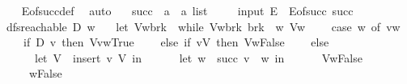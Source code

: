 \begin{isabellebody}
%
\isadelimproof
\ \ %
\endisadelimproof
%
\isatagproof
{}\isamarkupfalse%
\ E{\isacharunderscore}{\kern0pt}of{\isacharunderscore}{\kern0pt}succ{\isacharunderscore}{\kern0pt}def\ \isamarkupfalse%
\ auto%
\endisatagproof
{\isafoldproof}%
%
\isadelimproof
\isanewline
%
\endisadelimproof
\isanewline
{}\isamarkupfalse%
\isanewline
\ \ \ succ\ {\isacharcolon}{\kern0pt}{\isacharcolon}{\kern0pt}\ {\isachardoublequoteopen}{\isacharprime}{\kern0pt}a\ {\isasymRightarrow}\ {\isacharprime}{\kern0pt}a\ list{\isachardoublequoteclose}\isanewline
{}\isanewline
\isanewline
\ \ \ \isamarkupfalse%
\ {\isacharparenleft}{\kern0pt}input{\isacharparenright}{\kern0pt}\ {\isachardoublequoteopen}E\ {\isasymequiv}\ E{\isacharunderscore}{\kern0pt}of{\isacharunderscore}{\kern0pt}succ\ succ{\isachardoublequoteclose}\isanewline
\isanewline
\isanewline
{}\isamarkupfalse%
\ {\isachardoublequoteopen}dfs{\isacharunderscore}{\kern0pt}reachable\ D\ w\ {\isasymequiv}\isanewline
\ \ let\ {\isacharparenleft}{\kern0pt}V{\isacharcomma}{\kern0pt}w{\isacharcomma}{\kern0pt}brk{\isacharparenright}{\kern0pt}\ {\isacharequal}{\kern0pt}\ while\ {\isacharparenleft}{\kern0pt}{\isasymlambda}{\isacharparenleft}{\kern0pt}V{\isacharcomma}{\kern0pt}w{\isacharcomma}{\kern0pt}brk{\isacharparenright}{\kern0pt}{\isachardot}{\kern0pt}\ {\isasymnot}brk\ {\isasymand}\ w{\isasymnoteq}{\isacharbrackleft}{\kern0pt}{\isacharbrackright}{\kern0pt}{\isacharparenright}{\kern0pt}\ {\isacharparenleft}{\kern0pt}{\isasymlambda}{\isacharparenleft}{\kern0pt}V{\isacharcomma}{\kern0pt}w{\isacharcomma}{\kern0pt}{\isacharunderscore}{\kern0pt}{\isacharparenright}{\kern0pt}{\isachardot}{\kern0pt}\isanewline
\ \ \ \ case\ w\ of\ v{\isacharhash}{\kern0pt}w\ {\isasymRightarrow}\isanewline
\ \ \ \ if\ D\ v\ then\ {\isacharparenleft}{\kern0pt}V{\isacharcomma}{\kern0pt}v{\isacharhash}{\kern0pt}w{\isacharcomma}{\kern0pt}True{\isacharparenright}{\kern0pt}\isanewline
\ \ \ \ else\ if\ v{\isasymin}V\ then\ {\isacharparenleft}{\kern0pt}V{\isacharcomma}{\kern0pt}w{\isacharcomma}{\kern0pt}False{\isacharparenright}{\kern0pt}\isanewline
\ \ \ \ else\isanewline
\ \ \ \ \ \ let\ V\ {\isacharequal}{\kern0pt}\ insert\ v\ V\ in\isanewline
\ \ \ \ \ \ let\ w\ {\isacharequal}{\kern0pt}\ succ\ v\ {\isacharat}{\kern0pt}\ w\ in\isanewline
\ \ \ \ \ \ {\isacharparenleft}{\kern0pt}V{\isacharcomma}{\kern0pt}w{\isacharcomma}{\kern0pt}False{\isacharparenright}{\kern0pt}\isanewline
\ \ \ \ {\isacharparenright}{\kern0pt}\ {\isacharparenleft}{\kern0pt}{\isacharbraceleft}{\kern0pt}{\isacharbraceright}{\kern0pt}{\isacharcomma}{\kern0pt}w{\isacharcomma}{\kern0pt}False{\isacharparenright}{\kern0pt}\isanewline

\end{isabellebody}
